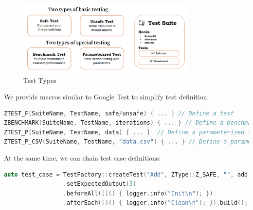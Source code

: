\documentclass{article}
\begin{document}
\begin{figure}[H]
    \centering
    \includegraphics[width=0.8\textwidth]{img/types.png} %
    \caption{Test Types}
    \label{fig:test types }
\end{figure}
We provide macros similar to Google Test to simplify test definition:
\begin{framed}
    \begin{lstlisting}[language=C++]
ZTEST_F(SuiteName, TestName, safe/unsafe) { ... } // Define a test 
ZBENCHMARK(SuiteName, TestName, iterations) { ... } // Define a benchmark
ZTEST_P(SuiteName, TestName, data) { ... }  // Define a parameterized test
ZTEST_P_CSV(SuiteName, TestName, "data.csv") { ... } // Define a parameterized test with csv data
\end{lstlisting}
\end{framed}

At the same time, we can chain test case definitions:
\begin{framed}
    \begin{lstlisting}[language=C++]
auto test_case = TestFactory::createTest("Add", ZType::Z_SAFE, "", add, 2, 3)
                 .setExpectedOutput(5)
                 .beforeAll([]() { logger.info("Init\n"); })          
                 .afterEach([]() { logger.info("Clean\n"); }).build();
                \end{lstlisting}
\end{framed}
\end{document}
